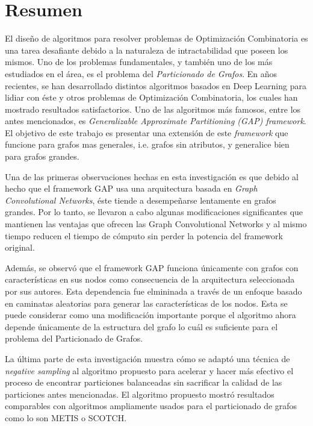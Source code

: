 

\chapter*{Resumen}

El diseño de algoritmos para resolver problemas de Optimización Combinatoria es una tarea desafiante debido a la naturaleza de intractabilidad que poseen los mismos. Uno de los problemas fundamentales, y también uno de los más estudiados en el área, es el problema del \textit{Particionado de Grafos}. En años recientes, se han desarrollado distintos algoritmos basados en Deep Learning para lidiar con éste y otros problemas de Optimización Combinatoria, los cuales han mostrado resultados satisfactorios. Uno de las algoritmos más famosos, entre los antes mencionados, es \textit{Generalizable Approximate Partitioning (GAP) framework}. El objetivo de este trabajo es presentar una extensión de este \textit{framework} que funcione para grafos mas generales, i.e. grafos sin atributos, y generalice bien para grafos grandes.  

Una de las primeras observaciones hechas en esta investigación es que debido al hecho que el framework GAP usa una arquitectura basada en \textit{Graph Convolutional Networks}, éste tiende a desempeñarse lentamente en grafos grandes. Por lo tanto, se llevaron a cabo algunas modificaciones significantes que mantienen las ventajas que ofrecen las Graph Convolutional Networks y al mismo tiempo reducen el tiempo de cómputo sin perder la potencia del framework original.

Además, se observó que el framework GAP funciona únicamente con grafos con características en sus nodos como consecuencia de la arquitectura seleccionada por sus autores. Esta dependencia fue elmininada a través de un enfoque basado en caminatas aleatorias para generar las características de los nodos. Esta se puede considerar como una modificación importante porque el algoritmo ahora depende únicamente de la estructura del grafo lo cuál es suficiente para el problema del Particionado de Grafos.

La última parte de esta investigación muestra cómo se adaptó una técnica de \textit{negative sampling} al algoritmo propuesto para acelerar y hacer más efectivo el proceso de encontrar particiones balanceadas sin sacrificar la calidad de las particiones antes mencionadas. El algoritmo propuesto mostró resultados comparables con algoritmos ampliamente usados para el particionado de grafos como lo son METIS o SCOTCH.

